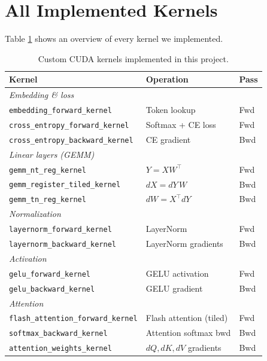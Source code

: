 \documentclass[11pt,letterpaper]{article}
\begin{document}
\section{All Implemented Kernels}
Table \ref{tab:all_kernels} shows an overview of every kernel we implemented.
\begin{table}[h]
\centering
\caption{Custom CUDA kernels implemented in this project.}
\label{tab:all_kernels}
\begin{tabular}{lll}
\toprule
\textbf{Kernel} & \textbf{Operation} & \textbf{Pass} \\
\midrule  
\multicolumn{3}{l}{\textit{Embedding \& loss}} \\
\texttt{embedding\_forward\_kernel}       & Token lookup              & Fwd \\
\texttt{cross\_entropy\_forward\_kernel}  & Softmax + CE loss         & Fwd \\
\texttt{cross\_entropy\_backward\_kernel} & CE gradient               & Bwd \\
\midrule
\multicolumn{3}{l}{\textit{Linear layers (GEMM)}} \\
\texttt{gemm\_nt\_reg\_kernel}            & $Y = X W^\top$            & Fwd \\
\texttt{gemm\_register\_tiled\_kernel}    & $dX = dY\, W$             & Bwd \\
\texttt{gemm\_tn\_reg\_kernel}            & $dW = X^\top dY$          & Bwd \\
\midrule
\multicolumn{3}{l}{\textit{Normalization}} \\
\texttt{layernorm\_forward\_kernel}       & LayerNorm                 & Fwd \\
\texttt{layernorm\_backward\_kernel}      & LayerNorm gradients       & Bwd \\
\midrule
\multicolumn{3}{l}{\textit{Activation}} \\
\texttt{gelu\_forward\_kernel}            & GELU activation           & Fwd \\
\texttt{gelu\_backward\_kernel}           & GELU gradient             & Bwd \\
\midrule
\multicolumn{3}{l}{\textit{Attention}} \\
\texttt{flash\_attention\_forward\_kernel}& Flash attention (tiled)   & Fwd \\
\texttt{softmax\_backward\_kernel}        & Attention softmax bwd     & Bwd \\
\texttt{attention\_weights\_kernel}       & $dQ, dK, dV$ gradients    & Bwd \\

\end{tabular}
\end{table}
\end{document}
